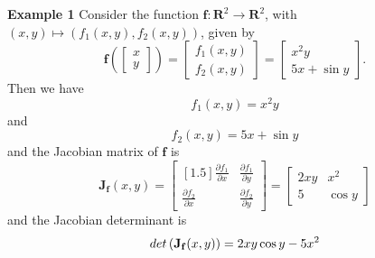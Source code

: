 \documentclass[14pt]{article}
\theoremstyle{definition}
\theoremstyle{remark}
\begin{document}
\textbf{Example 1}
Consider the function $\mathbf{f}: \mathbf{R}^2 \rightarrow \mathbf{R}^2$, with $(x, y) \mapsto\left(f_1(x, y), f_2(x, y)\right)$, given by
$$
    \mathbf{f}\left(\left[\begin{array}{l}
            x \\
            y
        \end{array}\right]\right)=\left[\begin{array}{l}
            f_1(x, y) \\
            f_2(x, y)
        \end{array}\right]=\left[\begin{array}{c}
            x^2 y \\
            5 x+\sin y
        \end{array}\right] .
$$
Then we have
$$
    f_1(x, y)=x^2 y
$$
and
$$
    f_2(x, y)=5 x+\sin y
$$
and the Jacobian matrix of $\mathbf{f}$ is
$$
    \mathbf{J}_{\mathbf{f}}(x, y)=\begin{bmatrix}[1.5]
        \frac{\partial f_1}{\partial x} & \frac{\partial f_1}{\partial y} \\
        \frac{\partial f_2}{\partial x} & \frac{\partial f_2}{\partial y}
    \end{bmatrix}=\left[\begin{array}{cc}
            2 x y & x^2    \\
            5     & \cos y
        \end{array}\right]
$$
and the Jacobian determinant is
$$
    \\det\left(\mathbf{J}_{\mathbf{f}}(x, y)\right)=2 x y \cos y-5 x^2
$$
\end{document}
